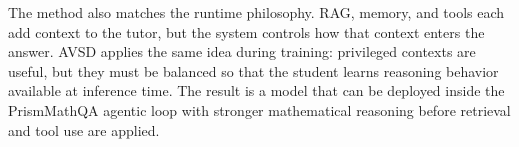 The method also matches the runtime philosophy. RAG, memory, and tools each add context to the tutor, but the system controls how that context enters the answer. AVSD applies the same idea during training: privileged contexts are useful, but they must be balanced so that the student learns reasoning behavior available at inference time. The result is a model that can be deployed inside the PrismMathQA agentic loop with stronger mathematical reasoning before retrieval and tool use are applied.
